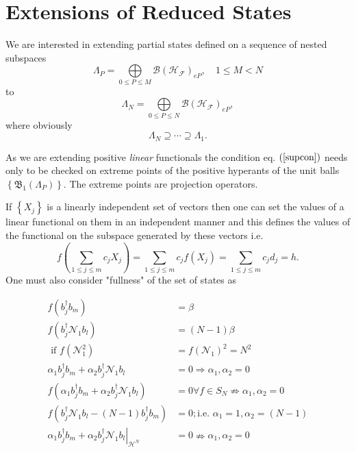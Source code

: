 \documentclass[aps,preprint]{revtex4}%
\begin{document}
\section{Extensions of Reduced States}

We are interested in extending partial states defined on a sequence of nested
subspaces
\begin{equation}
\Lambda_{P}=%
{\displaystyle\bigoplus\limits_{0\leq P\leq M}}
\mathcal{B}\left(  \mathcal{H}_{\mathcal{F}}\right)  _{eP},\quad1\leq M<N
\end{equation}
to%
\begin{equation}
\Lambda_{N}=%
{\displaystyle\bigoplus\limits_{0\leq P\leq N}}
\mathcal{B}\left(  \mathcal{H}_{\mathcal{F}}\right)  _{eP},
\end{equation}
where obviously
\begin{equation}
\Lambda_{N}\supseteq\cdots\supseteq\Lambda_{1}.
\end{equation}


As we are extending positive \emph{linear} functionals the condition eq.
$\left(  \ref{supcon}\right)  $ needs only to be checked on extreme points of
the positive hyperants of the unit balls $\left\{  \mathfrak{B}_{1}\left(
\Lambda_{P}\right)  \right\}  $. The extreme points are projection operators.

If $\left\{  X_{j}\right\}  $ is a linearly independent set of vectors then
one can set the values of a linear functional on them in an independent manner
and this defines the values of the functional on the subspace generated by
these vectors i.e.
\begin{equation}
f\left(  \sum_{1\leq j\leq m}c_{j}X_{j}\right)  =\sum_{1\leq j\leq m}%
c_{j}f\left(  X_{j}\right)  =\sum_{1\leq j\leq m}c_{j}d_{j}=h.
\end{equation}
One must also consider "fullness" of the set of states as%

\begin{align}
f\left(  b_{j}^{\dagger}b_{m}\right)   &  =\beta\\
f\left(  b_{j}^{\dagger}\mathcal{N}_{1}b_{l}\right)   &  =\left(  N-1\right)
\beta\\
\text{ if }f\left(  \mathcal{N}_{1}^{2}\right)   &  =f\left(  \mathcal{N}%
_{1}\right)  ^{2}=N^{2}\\
\alpha_{1}b_{j}^{\dagger}b_{m}+\alpha_{2}b_{j}^{\dagger}\mathcal{N}_{1}b_{l}
&  =0\Rightarrow\alpha_{1},\alpha_{2}=0\\
f\left(  \alpha_{1}b_{j}^{\dagger}b_{m}+\alpha_{2}b_{j}^{\dagger}%
\mathcal{N}_{1}b_{l}\right)   &  =0\forall f\in S_{N}\nRightarrow\alpha
_{1},\alpha_{2}=0\\
f\left(  b_{j}^{\dagger}\mathcal{N}_{1}b_{l}-\left(  N-1\right)
b_{j}^{\dagger}b_{m}\right)   &  =0;\text{i.e. }\alpha_{1}=1,\alpha
_{2}=\left(  N-1\right) \\
\left.  \alpha_{1}b_{j}^{\dagger}b_{m}+\alpha_{2}b_{j}^{\dagger}%
\mathcal{N}_{1}b_{l}\right\vert _{\mathcal{H}^{N}}  &  =0\nRightarrow
\alpha_{1},\alpha_{2}=0
\end{align}
\end{document}
